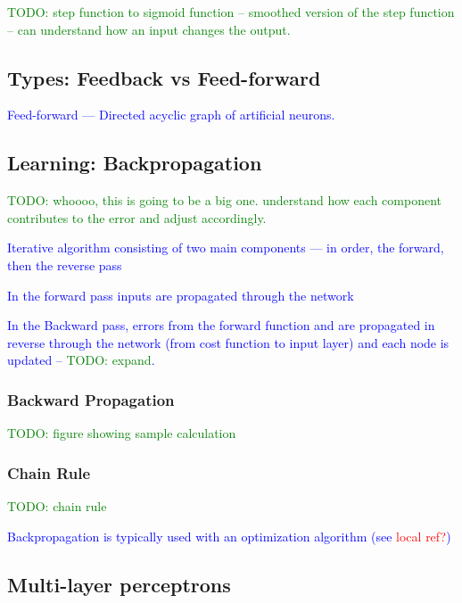 \textcolor{green}{TODO: step function to sigmoid function -- smoothed version of the step function -- can understand how an input changes the output.}

\subsection{Types: Feedback vs Feed-forward}

\textcolor{blue}{Feed-forward --- Directed acyclic graph of artificial neurons.}

\subsection{Learning: Backpropagation}

\textcolor{green}{TODO: whoooo, this is going to be a big one. understand how each component contributes to the error and adjust accordingly.}

\textcolor{blue}{Iterative algorithm consisting of two main components --- in order, the forward, then the reverse pass}

\textcolor{blue}{In the forward pass inputs are propagated through the network}

\textcolor{blue}{In the Backward pass, errors from the forward function and  are propagated in reverse through the network (from cost function to input layer) and each node is updated -- \textcolor{green}{TODO: expand}.}

\subsubsection{Backward Propagation}


\textcolor{green}{TODO: figure showing sample calculation}

\subsubsection{Chain Rule}

\textcolor{green}{TODO: chain rule}

\textcolor{blue}{Backpropagation is typically used with an optimization algorithm (see \textcolor{red}{local ref?})}

\subsection{Multi-layer perceptrons}